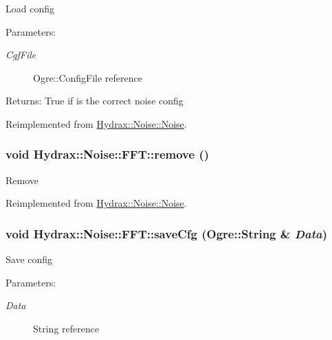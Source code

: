 Load config \begin{Desc}
\item[Parameters:]
\begin{description}
\item[{\em CgfFile}]Ogre::ConfigFile reference \end{description}
\end{Desc}
\begin{Desc}
\item[Returns:]True if is the correct noise config \end{Desc}


Reimplemented from \hyperlink{class_hydrax_1_1_noise_1_1_noise_5ef6e71282a9dfcefc09e3ba84a7578f}{Hydrax::Noise::Noise}.\hypertarget{class_hydrax_1_1_noise_1_1_f_f_t_9567d90d8fae8dbd74d05d1e3b8281e4}{
\subsubsection[{remove}]{\setlength{\rightskip}{0pt plus 5cm}void Hydrax::Noise::FFT::remove ()}}
\label{class_hydrax_1_1_noise_1_1_f_f_t_9567d90d8fae8dbd74d05d1e3b8281e4}


Remove 

Reimplemented from \hyperlink{class_hydrax_1_1_noise_1_1_noise_00c4aaa7604ea492740318d01f651606}{Hydrax::Noise::Noise}.\hypertarget{class_hydrax_1_1_noise_1_1_f_f_t_6e045d4c71f1005305445dbae8701736}{
\subsubsection[{saveCfg}]{\setlength{\rightskip}{0pt plus 5cm}void Hydrax::Noise::FFT::saveCfg (Ogre::String \& {\em Data})}}
\label{class_hydrax_1_1_noise_1_1_f_f_t_6e045d4c71f1005305445dbae8701736}


Save config \begin{Desc}
\item[Parameters:]
\begin{description}
\item[{\em Data}]String reference \end{description}
\end{Desc}


